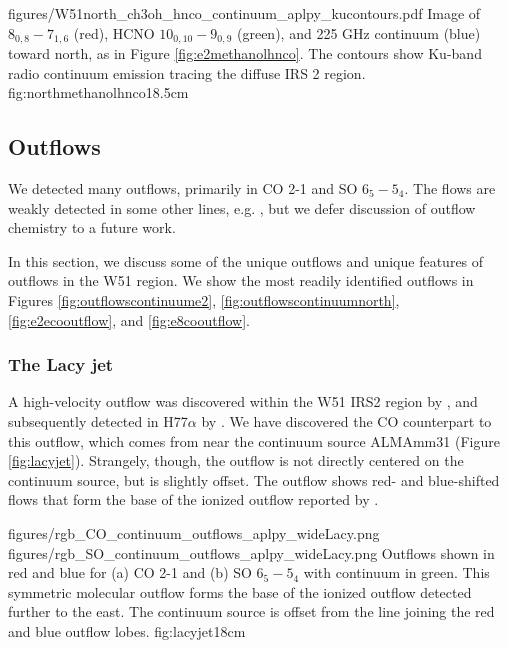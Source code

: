 \documentclass{aa}
\begin{document}
\Figure
{figures/W51north_ch3oh_hnco_continuum_aplpy_kucontours.pdf}
{Image of \methanol $8_{0,8}-7_{1,6}$ (red), HCNO $10_{0,10}-9_{0,9}$ (green),
and 225 GHz continuum (blue) toward  north, as in Figure
\ref{fig:e2methanolhnco}.  The contours show Ku-band radio continuum emission
tracing the diffuse IRS 2 \hii region.}
{fig:northmethanolhnco}{1}{8.5cm}


\subsection{Outflows}
\label{sec:outflows}
We detected many outflows, primarily in CO 2-1 and SO $6_5-5_4$.  The flows are
weakly detected in some other lines, e.g. \formaldehyde, but we defer
discussion of outflow chemistry to a future work.

In this section, we discuss some of the unique outflows and unique features of
outflows in the W51 region.  We show the most readily identified outflows in
Figures \ref{fig:outflowscontinuume2}, \ref{fig:outflowscontinuumnorth},
\ref{fig:e2ecooutflow}, and \ref{fig:e8cooutflow}.

\subsubsection{The Lacy jet}
\label{sec:lacyjet}
A high-velocity outflow was discovered within the W51 IRS2 region by
\citet{Lacy2007a}, and subsequently detected in H77$\alpha$ by
\citet{Ginsburg2016b}.  We have discovered the CO counterpart to this
outflow, which comes from near the continuum source ALMAmm31 (Figure
\ref{fig:lacyjet}).  Strangely, though, the outflow is not directly centered on
the continuum source, but is slightly offset.  The outflow shows red- and
blue-shifted flows that form the base of the ionized outflow reported by
\citet[][Figure \ref{fig:outflowscontinuumnorth}]{Lacy2007a}.


\FigureTwo
{figures/rgb_CO_continuum_outflows_aplpy_wideLacy.png}
{figures/rgb_SO_continuum_outflows_aplpy_wideLacy.png}
{Outflows shown in red and blue for (a) CO 2-1 and (b) SO $6_5-5_4$ with
continuum in green.  This symmetric molecular outflow forms the base of the
\citet{Lacy2007a} ionized outflow detected further to the east.
The continuum source is offset from the line joining the red and blue outflow lobes.}
{fig:lacyjet}{1}{8cm}
\end{document}
